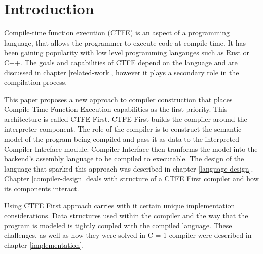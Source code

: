 \section{Introduction}


Compile-time function execution (CTFE) is an aspect of a programming language, that allows the programmer to execute code at compile-time.
It has been gaining popularity with low level programming langauges such as Rust or C++.
The goals and capabilities of CTFE depend on the language and are discussed in chapter \ref{related-work}, however it plays a secondary role in the compilation process.

This paper proposes a new approach to compiler construction that places Compile Time Function Execution capabilities as the first priority.
This architecture is called CTFE First.
CTFE First builds the compiler around the interpreter component.
The role of the compiler is to construct the semantic model of the program being compiled and pass it as data to the interpreted Compiler-Intreface module.
Compiler-Interface then tranforms the model into the backend's assembly language to be compiled to executable.
The design of the language that sparked this approach was described in chapter \ref{language-design}.
Chapter \ref{compiler-design} deals with structure of a CTFE First compiler and how its components interact.

Using CTFE First approach carries with it certain unique implementation considerations.
Data structures used within the compiler and the way that the program is modeled is tightly coupled with the compiled language.
These challenges, as well as how they were solved in C-=-1 compiler were described in chapter \ref{implementation}.
